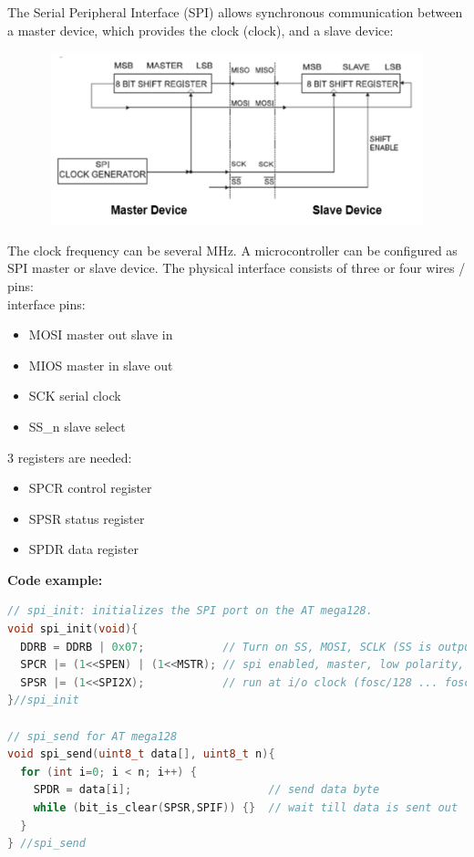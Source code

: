 The Serial Peripheral Interface (SPI) allows synchronous communication between a master device, which provides the clock (clock), and a slave device:

    \begin{figure}[h]
    \centering
    \includegraphics[width=12cm, height=5cm]{Images/image44.png}
    \label{fig:Fig }
    \end{figure}
    
The clock frequency can be several MHz. A microcontroller can be configured as SPI master or slave device. The physical interface consists of three or four wires / pins:\\
 interface pins:

\begin{itemize}
\item  MOSI  master out slave in
\item  MIOS  master in slave out
\item  SCK   serial clock
\item  SS\_n  slave select
\end{itemize}

3 registers are needed:

\begin{itemize}
\item  SPCR  control register
\item  SPSR  status register
\item  SPDR  data register
\end{itemize}

\textbf{Code example:}

\begin{lstlisting}[style=mystyle, language=c]
// spi_init: initializes the SPI port on the AT mega128. 
void spi_init(void){
  DDRB = DDRB | 0x07;            // Turn on SS, MOSI, SCLK (SS is output)
  SPCR |= (1<<SPEN) | (1<<MSTR); // spi enabled, master, low polarity, msb 1st
  SPSR |= (1<<SPI2X);            // run at i/o clock (fosc/128 ... fosc/2) div 2
}//spi_init

// spi_send for AT mega128 
void spi_send(uint8_t data[], uint8_t n){
  for (int i=0; i < n; i++) {
    SPDR = data[i];                     // send data byte
    while (bit_is_clear(SPSR,SPIF)) {}  // wait till data is sent out
  }
} //spi_send
\end{lstlisting}

